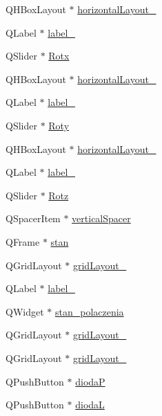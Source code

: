 \begin{DoxyCompactItemize}
Q\+H\+Box\+Layout $\ast$ \hyperlink{class_ui___main_window_a03ce63974cc69b067c91bbf285cceca8}{horizontal\+Layout\+\_}
\item 
Q\+Label $\ast$ \hyperlink{class_ui___main_window_a9dc4dba26b83e0c94aa566e1c564420b}{label\+\_}
\item 
Q\+Slider $\ast$ \hyperlink{class_ui___main_window_a72eff817e22aca744b94f7ffe1a2b612}{Rotx}
\item 
Q\+H\+Box\+Layout $\ast$ \hyperlink{class_ui___main_window_ae183387a7d233b437a637b403ba39ffd}{horizontal\+Layout\+\_}
\item 
Q\+Label $\ast$ \hyperlink{class_ui___main_window_a4f12a71b4a2fb6f85df2300d83b5ed3e}{label\+\_}
\item 
Q\+Slider $\ast$ \hyperlink{class_ui___main_window_ad0d84017170ff9d9b25ac2ec7dbd4018}{Roty}
\item 
Q\+H\+Box\+Layout $\ast$ \hyperlink{class_ui___main_window_a14c9d4842c3e97e16e7873ef0aecdb1e}{horizontal\+Layout\+\_}
\item 
Q\+Label $\ast$ \hyperlink{class_ui___main_window_aa2621565827195e88436fb54220bb48d}{label\+\_}
\item 
Q\+Slider $\ast$ \hyperlink{class_ui___main_window_a7d94d709ceb1cbfd5b0baf55c5aca2f1}{Rotz}
\item 
Q\+Spacer\+Item $\ast$ \hyperlink{class_ui___main_window_a8384329c3663ff274e926a12024aab52}{vertical\+Spacer}
\item 
Q\+Frame $\ast$ \hyperlink{class_ui___main_window_a5c755e820d4d40f2d01867cfffef4148}{stan}
\item 
Q\+Grid\+Layout $\ast$ \hyperlink{class_ui___main_window_a63157bad53e80af9d929e38b532867a0}{grid\+Layout\+\_}
\item 
Q\+Label $\ast$ \hyperlink{class_ui___main_window_a663f728e6244926a795c6e6892673b1d}{label\+\_}
\item 
Q\+Widget $\ast$ \hyperlink{class_ui___main_window_ac18f423ddbfb49757b21431f382e4e17}{stan\+\_\+polaczenia}
\item 
Q\+Grid\+Layout $\ast$ \hyperlink{class_ui___main_window_a1f91d05a063890efd359caac0338c7b0}{grid\+Layout\+\_}
\item 
Q\+Grid\+Layout $\ast$ \hyperlink{class_ui___main_window_a2bb984d720e889f05d38dac3cf7949c9}{grid\+Layout\+\_}
\item 
Q\+Push\+Button $\ast$ \hyperlink{class_ui___main_window_a99460c6278d1021660c62f337f7cae26}{diodaP}
\item 
Q\+Push\+Button $\ast$ \hyperlink{class_ui___main_window_a1e35f167149c4e8163eced1037d6e3a6}{diodaL}

\end{DoxyCompactItemize}

